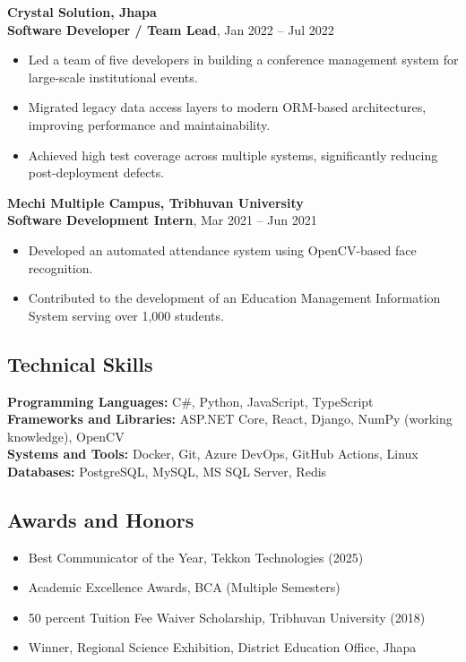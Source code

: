 \textbf{Crystal Solution, Jhapa}\\
\textbf{Software Developer / Team Lead}, Jan 2022 -- Jul 2022

\begin{itemize}
\tightlist
\item
  Led a team of five developers in building a conference management
  system for large-scale institutional events.
\item
  Migrated legacy data access layers to modern ORM-based architectures,
  improving performance and maintainability.
\item
  Achieved high test coverage across multiple systems, significantly
  reducing post-deployment defects.
\end{itemize}

\textbf{Mechi Multiple Campus, Tribhuvan University}\\
\textbf{Software Development Intern}, Mar 2021 -- Jun 2021

\begin{itemize}
\tightlist
\item
  Developed an automated attendance system using OpenCV-based face
  recognition.
\item
  Contributed to the development of an Education Management Information
  System serving over 1,000 students.
\end{itemize}

\hypertarget{technical-skills}{%
\subsection{\texorpdfstring{\textbf{Technical
Skills}}{Technical Skills}}\label{technical-skills}}

\textbf{Programming Languages:} C\#, Python, JavaScript, TypeScript\\
\textbf{Frameworks and Libraries:} ASP.NET Core, React, Django, NumPy
(working knowledge), OpenCV\\
\textbf{Systems and Tools:} Docker, Git, Azure DevOps, GitHub Actions,
Linux\\
\textbf{Databases:} PostgreSQL, MySQL, MS SQL Server, Redis

\hypertarget{awards-and-honors}{%
\subsection{\texorpdfstring{\textbf{Awards and
Honors}}{Awards and Honors}}\label{awards-and-honors}}

\begin{itemize}
\tightlist
\item
  Best Communicator of the Year, Tekkon Technologies (2025)
\item
  Academic Excellence Awards, BCA (Multiple Semesters)
\item
  50 percent Tuition Fee Waiver Scholarship, Tribhuvan University (2018)
\item
  Winner, Regional Science Exhibition, District Education Office, Jhapa
\end{itemize}

